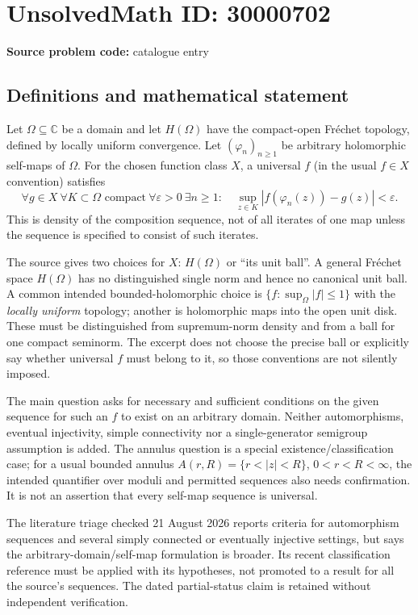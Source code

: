 \documentclass[11pt]{article}
\newcommand{\C}{\mathbb{C}}
\begin{document}
\section*{UnsolvedMath ID: 30000702}
\textbf{Source problem code:} catalogue entry
\subsection{Definitions and mathematical statement}
Let $\Omega\subseteq\C$ be a domain and let $H(\Omega)$ have the compact-open Fr\'echet topology, defined by locally uniform convergence. Let $(\varphi_n)_{n\geq1}$ be arbitrary holomorphic self-maps of $\Omega$. For the chosen function class $X$, a universal $f$ (in the usual $f\in X$ convention) satisfies
\[
 \forall g\in X\ \forall K\subset\Omega\text{ compact}\ 
 \forall\varepsilon>0\ \exists n\geq1:\quad
 \sup_{z\in K}|f(\varphi_n(z))-g(z)|<\varepsilon.
\]
This is density of the composition sequence, not of all iterates of one map unless the sequence is specified to consist of such iterates.

The source gives two choices for $X$: $H(\Omega)$ or ``its unit ball''. A general Fr\'echet space $H(\Omega)$ has no distinguished single norm and hence no canonical unit ball. A common intended bounded-holomorphic choice is $\{f:\sup_\Omega|f|\leq1\}$ with the \emph{locally uniform} topology; another is holomorphic maps into the open unit disk. These must be distinguished from supremum-norm density and from a ball for one compact seminorm. The excerpt does not choose the precise ball or explicitly say whether universal $f$ must belong to it, so those conventions are not silently imposed.

The main question asks for necessary and sufficient conditions on the given sequence for such an $f$ to exist on an arbitrary domain. Neither automorphisms, eventual injectivity, simple connectivity nor a single-generator semigroup assumption is added. The annulus question is a special existence/classification case; for a usual bounded annulus $A(r,R)=\{r<|z|<R\}$, $0<r<R<\infty$, the intended quantifier over moduli and permitted sequences also needs confirmation. It is not an assertion that every self-map sequence is universal.

The literature triage checked 21 August 2026 reports criteria for automorphism sequences and several simply connected or eventually injective settings, but says the arbitrary-domain/self-map formulation is broader. Its recent classification reference must be applied with its hypotheses, not promoted to a result for all the source's sequences. The dated partial-status claim is retained without independent verification.
\end{document}
